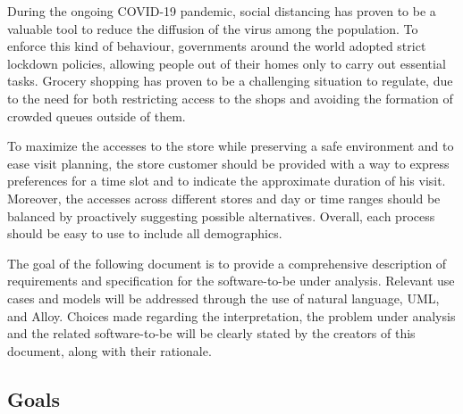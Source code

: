 \documentclass[../../main.tex]{subfiles}
\begin{document}
During the ongoing COVID-19 pandemic, social distancing has proven to be a valuable tool to reduce the diffusion of the virus among the population. To enforce this kind of behaviour,
governments around the world adopted strict lockdown policies, allowing people out of their homes only to carry out essential tasks.
Grocery shopping has proven to be a challenging situation to regulate, due to the need for both restricting access to the shops and 
avoiding the formation of crowded queues outside of them.

To maximize the accesses to the store while preserving a safe environment and to ease visit planning, the store customer should be provided with a way to express preferences for a time slot 
and to indicate the approximate duration of his visit.
Moreover, the accesses across different stores and day or time ranges should be balanced by proactively suggesting possible alternatives.
Overall, each process should be easy to use to include all demographics.

The goal of the following document is to provide a comprehensive description of requirements and specification for the software-to-be under analysis. 
Relevant use cases and models will be addressed through the use of natural language, UML, and Alloy. 
Choices made regarding the interpretation, the problem under analysis and the related software-to-be will be clearly stated by the creators of this document, along with their rationale.

\subsection{Goals}

\end{document}
